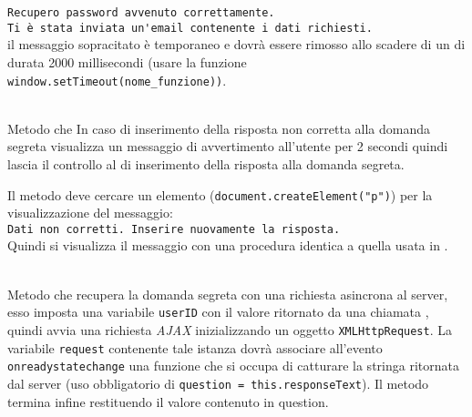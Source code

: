 \begin{description}
	\verb|Recupero password avvenuto correttamente.|\\
	\verb|Ti è stata inviata un'email contenente i dati richiesti.|\\
	
il messaggio sopracitato è temporaneo e dovrà essere rimosso allo scadere di un  di durata 2000 millisecondi (usare la funzione \texttt{window.setTimeout(nome\_funzione))}.
	
	\item{}\\
	Metodo che In caso di inserimento della risposta non corretta alla domanda segreta visualizza un messaggio di avvertimento all'utente per 2 secondi quindi lascia il controllo al  di inserimento della risposta alla domanda segreta.
	
	Il metodo deve cercare un elemento (\texttt{document.createElement("p")}) per la visualizzazione del messaggio:\\
	
	\verb|Dati non corretti. Inserire nuovamente la risposta.|\\
	
	Quindi si visualizza il messaggio con una procedura identica a quella usata in .
		
	\item{}\\
	Metodo che recupera la domanda segreta con una richiesta asincrona al server, esso imposta una variabile \texttt{userID} con il valore ritornato da una chiamata , quindi avvia una richiesta \textit{AJAX} inizializzando un oggetto \texttt{XMLHttpRequest}. La variabile \texttt{request} contenente tale istanza dovrà associare all'evento \texttt{onreadystatechange} una funzione che si occupa di catturare la stringa ritornata dal server (uso obbligatorio di \texttt{question = this.responseText}). Il metodo termina infine restituendo il valore contenuto in question.
	

\end{description}
